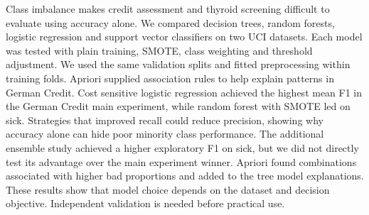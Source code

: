 Class imbalance makes credit assessment and thyroid screening difficult to evaluate using accuracy alone. We compared decision trees, random forests, logistic regression and support vector classifiers on two UCI datasets. Each model was tested with plain training, SMOTE, class weighting and threshold adjustment. We used the same validation splits and fitted preprocessing within training folds. Apriori supplied association rules to help explain patterns in German Credit. Cost sensitive logistic regression achieved the highest mean F1 in the German Credit main experiment, while random forest with SMOTE led on sick. Strategies that improved recall could reduce precision, showing why accuracy alone can hide poor minority class performance. The additional ensemble study achieved a higher exploratory F1 on sick, but we did not directly test its advantage over the main experiment winner. Apriori found combinations associated with higher bad proportions and added to the tree model explanations. These results show that model choice depends on the dataset and decision objective. Independent validation is needed before practical use.
